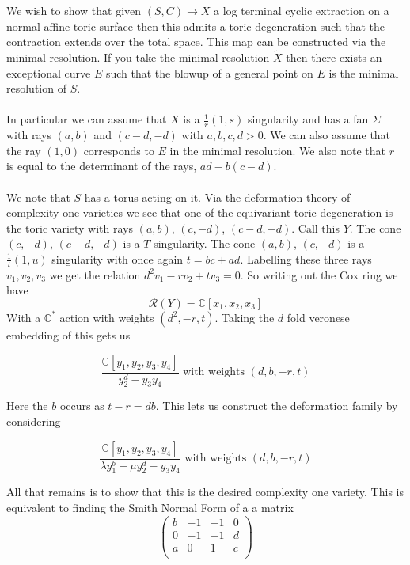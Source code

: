 \documentclass[11pt]{report}
\theoremstyle{definition}
\theoremstyle{definition}
\theoremstyle{definition}
\theoremstyle{definition}
\theoremstyle{definition}
\theoremstyle{definition}
\theoremstyle{definition}
\begin{document}
 

We wish to show that given $(S, C) \rightarrow X$ a log terminal cyclic extraction on a normal affine toric surface then this admits a toric degeneration such that the contraction extends over the total space. This map can be constructed via the minimal resolution. If you take the minimal resolution $\widetilde{X}$ then there exists an exceptional curve $E$ such that the blowup of a general point on $E$ is the minimal resolution of $S$.
\\
\\
In particular we can assume that $X$ is a $\frac{1}{r}(1,s)$ singularity and has a fan $\Sigma$ with rays $(a,b)$ and $(c-d,-d)$ with $a,b,c,d  > 0$. We can also assume that the ray $(1,0)$ corresponds to $E$ in the minimal resolution. We also note that $r$ is equal to the determinant of the rays, $ad - b(c-d)$. 
\\
\\
We note that $S$ has a torus acting on it. Via the deformation theory of complexity one varieties we see that one of the equivariant toric degeneration is the toric variety with rays $(a,b)$, $(c,-d)$, $(c-d,-d)$. Call this $Y$. The cone $(c,-d)$, $(c-d,-d)$ is a $T$-singularity. The cone  $(a,b)$, $(c,-d)$ is a $\frac{1}{t}(1, u)$ singularity with once again $t = bc + ad$. Labelling these three rays $v_1, v_2, v_3$ we get the relation $d^2 v_1 - r v_2 + t v_3 = 0$. So writing out the Cox ring we have 
\[
\mathcal{R}(Y)  = \mathbb{C}[x_1, x_2, x_3] 
\]
With a $\mathbb{C}^*$ action with weights $(d^2, -r, t)$. Taking the $d$ fold veronese embedding of this gets us 

\[
\frac{\mathbb{C}[y_1, y_2, y_3,  y_4]}{y_2^d -y_3 y_4} \text{  with weights } (d, b, -r, t)
\]

Here the $b$ occurs as $t-r = db$. This lets us construct the deformation family by considering 

\[
\frac{\mathbb{C}[y_1, y_2, y_3,  y_4]}{\lambda y_1^b  + \mu y_2^d - y_3 y_4} \text{  with weights } (d, b, -r, t)
\]

All that remains is to show that this is the desired complexity one variety. This is equivalent to finding the Smith Normal Form of a a matrix 
\[
 \left(
 \begin{array}{cccc}
b & -1 & -1 & 0 \\
0 & -1 & -1 & d \\
a & 0 & 1 & c \\
\end{array}
\right) 
\]
\end{document}
